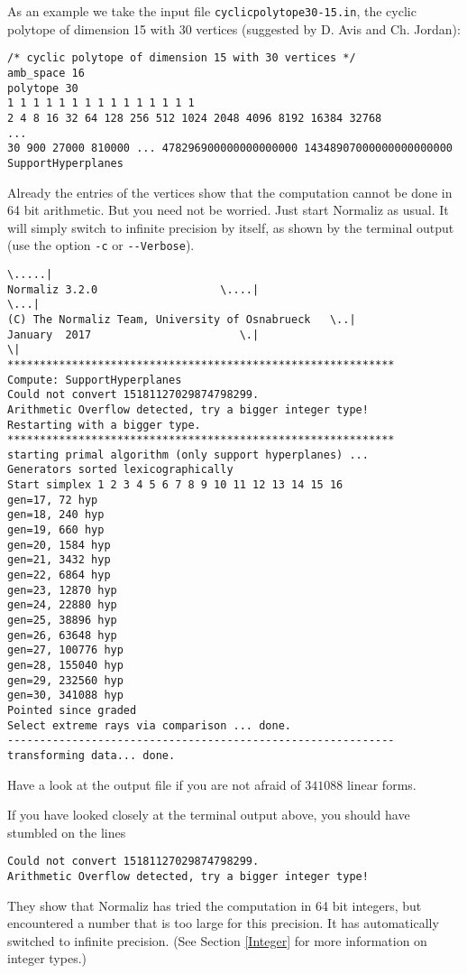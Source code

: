 \documentclass[12pt,a4paper]{scrartcl}
\theoremstyle{definition}
\begin{document}
As an example we take the input file \verb|cyclicpolytope30-15.in|, the cyclic polytope of dimension 15 with 30 vertices (suggested by D. Avis and Ch. Jordan):
\begin{Verbatim}
/* cyclic polytope of dimension 15 with 30 vertices */
amb_space 16
polytope 30
1 1 1 1 1 1 1 1 1 1 1 1 1 1 1
2 4 8 16 32 64 128 256 512 1024 2048 4096 8192 16384 32768
...
30 900 27000 810000 ... 478296900000000000000 14348907000000000000000
SupportHyperplanes
\end{Verbatim}
Already the entries of the vertices show that the computation cannot be done in 64 bit arithmetic. But you need not be worried. Just start Normaliz as usual. It will simply switch to infinite precision by itself, as shown by the terminal output (use the option \verb|-c| or \verb|--Verbose|).
\begin{Verbatim}
\.....|
Normaliz 3.2.0                   \....|
\...|
(C) The Normaliz Team, University of Osnabrueck   \..|
January  2017                       \.|
\|
************************************************************
Compute: SupportHyperplanes 
Could not convert 15181127029874798299.
Arithmetic Overflow detected, try a bigger integer type!
Restarting with a bigger type.
************************************************************
starting primal algorithm (only support hyperplanes) ...
Generators sorted lexicographically
Start simplex 1 2 3 4 5 6 7 8 9 10 11 12 13 14 15 16 
gen=17, 72 hyp
gen=18, 240 hyp
gen=19, 660 hyp
gen=20, 1584 hyp
gen=21, 3432 hyp
gen=22, 6864 hyp
gen=23, 12870 hyp
gen=24, 22880 hyp
gen=25, 38896 hyp
gen=26, 63648 hyp
gen=27, 100776 hyp
gen=28, 155040 hyp
gen=29, 232560 hyp
gen=30, 341088 hyp
Pointed since graded
Select extreme rays via comparison ... done.
------------------------------------------------------------
transforming data... done.
\end{Verbatim}
Have a look at the output file if you are not afraid of $341088$ linear forms.

If you have looked closely at the terminal output above, you should have stumbled on the lines
\begin{Verbatim}
Could not convert 15181127029874798299.
Arithmetic Overflow detected, try a bigger integer type!
\end{Verbatim}
They show that Normaliz has tried the computation in 64 bit integers, but encountered a number that is too large for this precision. It has automatically switched to infinite precision. (See Section \ref{Integer} for more information on integer types.)
\end{document}

